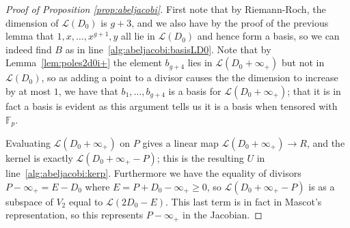 \documentclass[12pt]{article}
\newcommand{\Lcal}{\mathcal{L}}
\newcommand{\F}{\mathbb{F}}
\theoremstyle{plain}
\theoremstyle{definition}
\theoremstyle{remark}
\begin{document}
\begin{proof}[Proof of Proposition \ref{prop:abeljacobi}]
First note that by Riemann-Roch, the dimension of $\Lcal(D_0)$ is $g + 3$, and we also have by the proof of the previous lemma that $1,x,\dots,x^{g+1},y$ all lie in $\Lcal(D_0)$ and hence form a basis, so we can indeed find $B$ as in line~\ref{alg:abeljacobi:basisLD0}. Note that by Lemma~\ref{lem:poles2d0i+} the element $b_{g+4}$ lies in $\Lcal(D_0 + \infty_+)$ but not in $\Lcal(D_0)$, so as adding a point to a divisor causes the the dimension to increase by at most $1$, we have that $b_1,\dots,b_{g+4}$ is a basis for $\Lcal(D_0 + \infty_+)$; that it is in fact a basis is evident as this argument tells us it is a basis when tensored with $\F_p$.

Evaluating $\Lcal(D_0 + \infty_+)$ on $P$ gives a linear map $\Lcal(D_0 + \infty_+) \to R$, and the kernel is exactly $\Lcal(D_0 + \infty_+ - P)$; this is the resulting $U$ in line~\ref{alg:abeljacobi:kerp}. Furthermore we have the equality of divisors $P-\infty_+ = E - D_0$ where $E = P + D_0 - \infty_+ \geq 0$, so $\Lcal(D_0 + \infty_+ - P)$ is as a subspace of $V_2$ equal to $\Lcal(2D_0 - E)$. This last term is in fact in Mascot's representation, so this represents $P-\infty_+$ in the Jacobian.
\end{proof}
\end{document}

